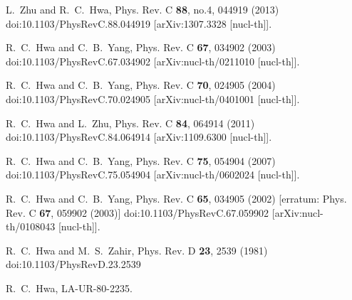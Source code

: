 \documentclass[twocolumn,aps,superscriptaddress,showpacs,nofootinbib,floatfix]{revtex4}
\begin{document}
\begin{thebibliography}{99}
L.~Zhu and R.~C.~Hwa,
Phys. Rev. C \textbf{88}, no.4, 044919 (2013)
doi:10.1103/PhysRevC.88.044919
[arXiv:1307.3328 [nucl-th]].

R.~C.~Hwa and C.~B.~Yang,
Phys. Rev. C \textbf{67}, 034902 (2003)
doi:10.1103/PhysRevC.67.034902
[arXiv:nucl-th/0211010 [nucl-th]].

R.~C.~Hwa and C.~B.~Yang,
Phys. Rev. C \textbf{70}, 024905 (2004)
doi:10.1103/PhysRevC.70.024905
[arXiv:nucl-th/0401001 [nucl-th]].

R.~C.~Hwa and L.~Zhu,
Phys. Rev. C \textbf{84}, 064914 (2011)
doi:10.1103/PhysRevC.84.064914
[arXiv:1109.6300 [nucl-th]].

R.~C.~Hwa and C.~B.~Yang,
Phys. Rev. C \textbf{75}, 054904 (2007)
doi:10.1103/PhysRevC.75.054904
[arXiv:nucl-th/0602024 [nucl-th]].

R.~C.~Hwa and C.~B.~Yang,
Phys. Rev. C \textbf{65}, 034905 (2002)
[erratum: Phys. Rev. C \textbf{67}, 059902 (2003)]
doi:10.1103/PhysRevC.67.059902
[arXiv:nucl-th/0108043 [nucl-th]].

R.~C.~Hwa and M.~S.~Zahir,
Phys. Rev. D \textbf{23}, 2539 (1981)
doi:10.1103/PhysRevD.23.2539

R.~C.~Hwa,
LA-UR-80-2235.
\end{thebibliography}
\end{document}
